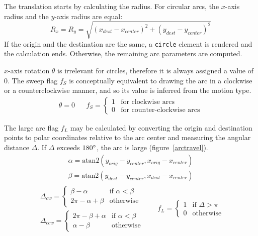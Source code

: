 The translation starts by calculating the radius. For circular arcs, the
$x$-axis radius and the $y$-axis radius are equal:
\begin{equation*}
    R_x = R_y = \sqrt{(x_{dest} - x_{center})^2 + (y_{dest} - y_{center})^2}
\end{equation*}
If the origin and the destination are the same, a \texttt{circle} element is
rendered and the calculation ends. Otherwise, the remaining arc parameters are
computed.

$x$-axis rotation $\theta$ is irrelevant for circles, therefore it is always
assigned a value of $0$. The sweep flag $f_S$ is conceptually equivalent to
drawing the arc in a clockwise or a counter\-clockwise manner, and so its value
is inferred from the motion type.
\begin{align*}
    \theta = 0 &&
    f_S = \begin{cases}
        1 & \text{for clockwise arcs} \\
        0 & \text{for counter-clockwise arcs}
    \end{cases}
\end{align*}

The large arc flag $f_L$ may be calculated by converting the origin and
destination points to polar coordinates relative to the arc center and measuring
the angular distance $\Delta$. If $\Delta$ exceeds $180\degree$, the arc is
large (figure~\ref{arctravel}).
\begin{gather*}
    \alpha = \text{atan2}(y_{orig} - y_{center}, x_{orig} - x_{center}) \\
    \beta = \text{atan2}(y_{dest} - y_{center}, x_{dest} - x_{center})
\end{gather*}
\begin{align*}
    \begin{aligned}
        \Delta_{cw} = \begin{cases}
            \beta - \alpha & \text{if } \alpha < \beta \\
            2\pi - \alpha + \beta & \text{otherwise}
        \end{cases} \\
        \Delta_{ccw} = \begin{cases}
            2\pi - \beta + \alpha & \text{if } \alpha < \beta \\
            \alpha - \beta & \text{otherwise}
        \end{cases}
    \end{aligned}
    &&
    f_L = \begin{cases}
        1 & \text{if } \Delta > \pi \\
        0 & \text{otherwise}
    \end{cases}
\end{align*}

